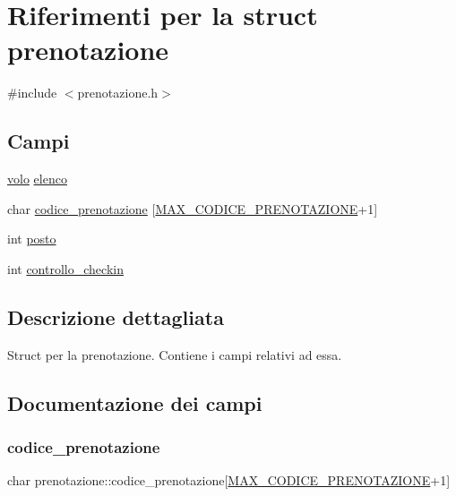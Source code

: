 \hypertarget{structprenotazione}{}\section{Riferimenti per la struct prenotazione}
\label{structprenotazione}


{\ttfamily \#include $<$prenotazione.\+h$>$}

\subsection*{Campi}
\begin{DoxyCompactItemize}
\item 
\hyperlink{structvolo}{volo} \hyperlink{structprenotazione_a990364d239fee56058bc07e82db99a69}{elenco}
\item 
char \hyperlink{structprenotazione_a42b10b920e50201567f442d79281df7f}{codice\+\_\+prenotazione} \mbox{[}\hyperlink{define_8h_acd5571872b6a27e5b227d08974ae679e}{M\+A\+X\+\_\+\+C\+O\+D\+I\+C\+E\+\_\+\+P\+R\+E\+N\+O\+T\+A\+Z\+I\+O\+NE}+1\mbox{]}
\item 
int \hyperlink{structprenotazione_a3a5dfed8c5d28b4e09d0757a24ae6f04}{posto}
\item 
int \hyperlink{structprenotazione_ad9b217a854eb164b54bca2c7cbb826bc}{controllo\+\_\+checkin}
\end{DoxyCompactItemize}


\subsection{Descrizione dettagliata}
Struct per la prenotazione. Contiene i campi relativi ad essa. 

\subsection{Documentazione dei campi}
\mbox{\label{structprenotazione_a42b10b920e50201567f442d79281df7f}} 
\subsubsection{\texorpdfstring{codice\+\_\+prenotazione}{codice\_prenotazione}}
{\footnotesize\ttfamily char prenotazione\+::codice\+\_\+prenotazione\mbox{[}\hyperlink{define_8h_acd5571872b6a27e5b227d08974ae679e}{M\+A\+X\+\_\+\+C\+O\+D\+I\+C\+E\+\_\+\+P\+R\+E\+N\+O\+T\+A\+Z\+I\+O\+NE}+1\mbox{]}}

